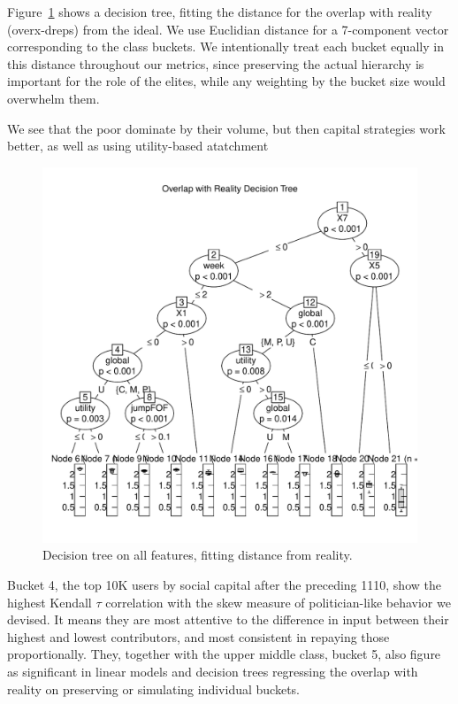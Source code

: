 \documentclass[10pt,oneside]{memoir}
\begin{document}
\begin{Spacing}{2}
Figure~\ref{figure:decision-tree-overx-dreps} shows a decision tree, fitting the distance for the overlap with reality (overx-dreps) from the ideal.  We use Euclidian distance for a 7-component vector corresponding to the class buckets.  We intentionally treat each bucket equally in this distance throughout our metrics, since preserving the actual hierarchy is important for the role of the elites, while any weighting by the bucket size would overwhelm them.


We see that the poor dominate by their volume, but then capital strategies work better, as well as using utility-based atatchment



\begin{figure}
\begin{center}
    \includegraphics{figures/decision-tree-overx-dreps}
    \caption{Decision tree on all features, fitting distance from reality.}
    \label{figure:decision-tree-overx-dreps}
\end{center}
\end{figure}
Bucket 4, the top 10K users by social capital after the preceding 1110, show the highest Kendall $\tau$ correlation with the skew measure of politician-like behavior we devised.  It means they are most attentive to the difference in input between their highest and lowest contributors, and most consistent in repaying those proportionally.  They, together with the upper middle class, bucket 5, also figure as significant in linear models and decision trees regressing the overlap with reality on preserving or simulating individual buckets.



\end{Spacing}
\end{document}
